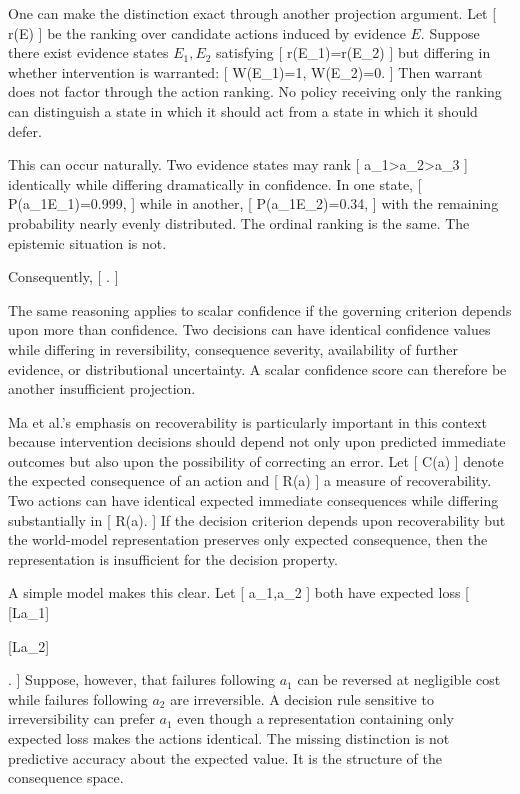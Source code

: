 \documentclass[11pt]{article}
\begin{document}
One can make the distinction exact through another projection argument. Let
[
r(E)
]
be the ranking over candidate actions induced by evidence $E$. Suppose there exist evidence states $E_1,E_2$ satisfying
[
r(E_1)=r(E_2)
]
but differing in whether intervention is warranted:
[
W(E_1)=1,
\qquad
W(E_2)=0.
]
Then warrant does not factor through the action ranking. No policy receiving only the ranking can distinguish a state in which it should act from a state in which it should defer.

This can occur naturally. Two evidence states may rank
[
a_1>a_2>a_3
]
identically while differing dramatically in confidence. In one state,
[
P(a_1\mid E_1)=0.999,
]
while in another,
[
P(a_1\mid E_2)=0.34,
]
with the remaining probability nearly evenly distributed. The ordinal ranking is the same. The epistemic situation is not.

Consequently,
[
\quad\not\Rightarrow\quad
{}.
]

The same reasoning applies to scalar confidence if the governing criterion depends upon more than confidence. Two decisions can have identical confidence values while differing in reversibility, consequence severity, availability of further evidence, or distributional uncertainty. A scalar confidence score can therefore be another insufficient projection.

Ma et al.'s emphasis on recoverability is particularly important in this context because intervention decisions should depend not only upon predicted immediate outcomes but also upon the possibility of correcting an error. Let
[
C(a)
]
denote the expected consequence of an action and
[
R(a)
]
a measure of recoverability. Two actions can have identical expected immediate consequences while differing substantially in
[
R(a).
]
If the decision criterion depends upon recoverability but the world-model representation preserves only expected consequence, then the representation is insufficient for the decision property.

A simple model makes this clear. Let
[
a_1,a_2
]
both have expected loss
[
[L\mid a_1]

[L\mid a_2]

\ell.
]
Suppose, however, that failures following $a_1$ can be reversed at negligible cost while failures following $a_2$ are irreversible. A decision rule sensitive to irreversibility can prefer $a_1$ even though a representation containing only expected loss makes the actions identical. The missing distinction is not predictive accuracy about the expected value. It is the structure of the consequence space.
\end{document}
